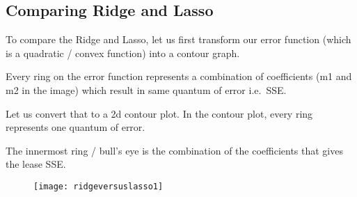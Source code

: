 	\subsection{Comparing Ridge and Lasso}
To compare the Ridge and Lasso, let us first transform our error function (which is a quadratic / convex function) into a contour graph.

	\begin{bulletedlist}
		\item Every ring on the error function represents a combination of coefficients (m1 and m2 in the image) which result in same quantum of error i.e.\ SSE.
		\item Let us convert that to a 2d contour plot.  In the contour plot, every ring represents one quantum of error.
		\item The innermost ring / bull's eye is the combination of the coefficients that gives the lease SSE.
	\end{bulletedlist}

	\begin{figure}[tbh]
		\centering
		\texttt{[image: ridgeversuslasso1]}
		\caption{}
		\label{fig:ridgeversuslasso1}
	\end{figure} 